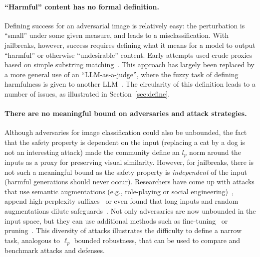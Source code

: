 \paragraph{``Harmful'' content has no formal definition.}
Defining success for an adversarial image is relatively easy: the perturbation is ``small'' under some given measure, and leads to a misclassification. With jailbreaks, however, success requires defining what it means for a model to output ``harmful'' or otherwise ``undesirable'' content. Early attempts used crude proxies based on simple substring matching~\citep{zou2023universal}.
This approach has largely been replaced by a more general use of an ``LLM-as-a-judge'', where the fuzzy task of defining harmfulness is given to another LLM~\citep{zheng2023judging,chao2023jailbreaking,shah2023scalable,mazeika2024harmbench}. The circularity of this definition leads to a number of issues, as illustrated in Section~\ref{sec:define}.


\paragraph{There are no meaningful bound on adversaries and attack strategies.} Although adversaries for image classification could also be unbounded, the fact that the safety property is dependent on the input (replacing a cat by a dog is not an interesting attack) made the community define an $l_p$ norm around the inputs as a proxy for preserving visual similarity. However, for jailbreaks, there is not such a meaningful bound as the safety property is \emph{independent} of the input (harmful generations should never occur). Researchers have come up with attacks that use semantic augmentations (e.g., role-playing or social engineering)~\citep{shah2023scalable,zeng2024johnny}, append high-perplexity suffixes~\citep{zou2023universal,thompson2024flrt} or even found that long inputs and random augmentations dilute safeguards~\citep{anil2024many,andriushchenko2024jailbreaking,hughes2024best}. Not only adversaries are now unbounded in the input space, but they can use additional methods such as fine-tuning~\citep{qi2024finetuning} or pruning~\citep{wei2024assessing}. This diversity of attacks illustrates the difficulty to define a narrow task, analogous to $\ell_p$ bounded robustness, that can be used to compare and benchmark attacks and defenses.

